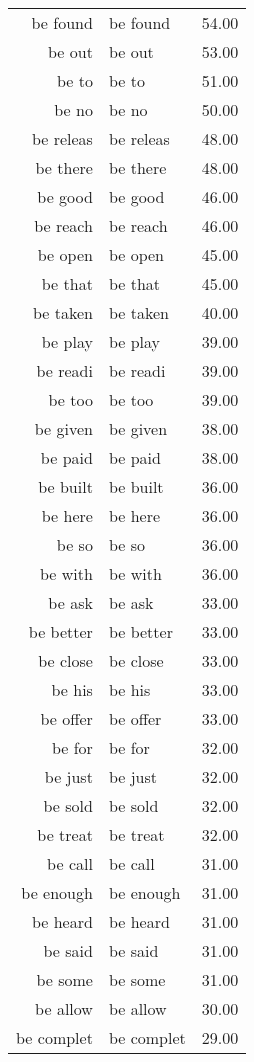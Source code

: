 \begin{table}[ht]
\begin{tabular}{rlr}
  be found & be found & 54.00 \\ 
  be out & be out & 53.00 \\ 
  be to & be to & 51.00 \\ 
  be no & be no & 50.00 \\ 
  be releas & be releas & 48.00 \\ 
  be there & be there & 48.00 \\ 
  be good & be good & 46.00 \\ 
  be reach & be reach & 46.00 \\ 
  be open & be open & 45.00 \\ 
  be that & be that & 45.00 \\ 
  be taken & be taken & 40.00 \\ 
  be play & be play & 39.00 \\ 
  be readi & be readi & 39.00 \\ 
  be too & be too & 39.00 \\ 
  be given & be given & 38.00 \\ 
  be paid & be paid & 38.00 \\ 
  be built & be built & 36.00 \\ 
  be here & be here & 36.00 \\ 
  be so & be so & 36.00 \\ 
  be with & be with & 36.00 \\ 
  be ask & be ask & 33.00 \\ 
  be better & be better & 33.00 \\ 
  be close & be close & 33.00 \\ 
  be his & be his & 33.00 \\ 
  be offer & be offer & 33.00 \\ 
  be for & be for & 32.00 \\ 
  be just & be just & 32.00 \\ 
  be sold & be sold & 32.00 \\ 
  be treat & be treat & 32.00 \\ 
  be call & be call & 31.00 \\ 
  be enough & be enough & 31.00 \\ 
  be heard & be heard & 31.00 \\ 
  be said & be said & 31.00 \\ 
  be some & be some & 31.00 \\ 
  be allow & be allow & 30.00 \\ 
  be complet & be complet & 29.00 \\ 

\end{tabular}
\end{table}
